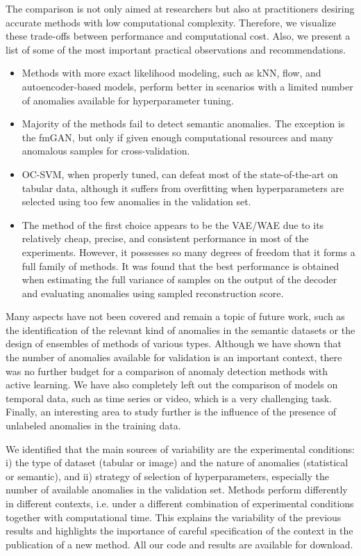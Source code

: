 The comparison is not only aimed at researchers but also at practitioners desiring accurate methods with low computational complexity. Therefore, we visualize these trade-offs between performance and computational cost. Also, we present a list of some of the most important practical observations and recommendations.
\begin{itemize}
    \item Methods with more exact likelihood modeling, such as kNN, flow, and autoencoder-based models, perform better in scenarios with a limited number of anomalies available for hyperparameter tuning.
    \item Majority of the methods fail to detect semantic anomalies. The exception is the fmGAN, but only if given enough computational resources and many anomalous samples for cross-validation. 
    \item OC-SVM, when properly tuned, can defeat most of the state-of-the-art on tabular data, although it suffers from overfitting when hyperparameters are selected using too few anomalies in the validation set.
    \item The method of the first choice appears to be the VAE/WAE due to its relatively cheap, precise, and consistent performance in most of the experiments. However, it possesses so many degrees of freedom that it forms a full family of methods. It was found that the best performance is obtained when estimating the full variance of samples on the output of the decoder and evaluating anomalies using sampled reconstruction score. 
\end{itemize}

Many aspects have not been covered and remain a topic of future work, such as the identification of the relevant kind of anomalies in the semantic datasets or the design of ensembles of methods of various types. Although we have shown that the number of anomalies available for validation is an important context, there was no further budget for a comparison of anomaly detection methods with active learning.  We have also completely left out the comparison of models on temporal data, such as time series or video, which is a very challenging task. Finally, an interesting area to study further is the influence of the presence of unlabeled anomalies in the training data.

We identified that the main sources of variability are the experimental conditions: i) the type of dataset (tabular or image) and the nature of anomalies (statistical or semantic), and ii) strategy of selection of hyperparameters, especially the number of available anomalies in the validation set. Methods perform differently in different contexts, i.e. under a different combination of experimental conditions together with computational time. This explains the variability of the previous results and highlights the importance of careful specification of the context in the publication of a new method. All our code and results are available for download.
